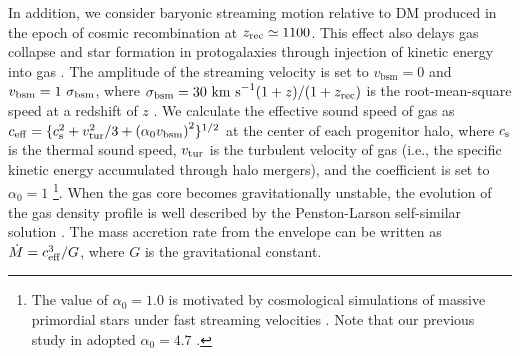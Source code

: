 \documentclass[twocolumn, twocolappendix]{aastex63}
\newcommand{\vbsm}{v_\mathrm{bsm}}
\begin{document}
\begin{CJK*}{UTF8}{gbsn}
In addition, we consider baryonic streaming motion relative to DM produced in the epoch of cosmic recombination at $z_{\rm rec} \simeq 1100$.
This effect also delays gas collapse and star formation in protogalaxies through injection of kinetic energy into gas
\citep[e.g.,][]{2012MNRAS.424.1335F, 2014MNRAS.439.1092T, 2017Sci...357.1375H,2019MNRAS.484.3510S,2021ApJ...917...60L}.
The amplitude of the streaming velocity is set to $\vbsm = 0$ and $\vbsm=1~\sigma_{\rm bsm}$, where $\sigma_{\rm bsm}=30~{\rm km~s}^{-1} (1+z)/(1+z_{\rm rec})$
is the root-mean-square speed at a redshift of $z$ \citep{2010PhRvD..82h3520T}.
We calculate the effective sound speed of gas as $c_{\rm eff} = \{c_{\rm s}^2+v_{\rm tur}^2/3+\left(\alpha_0 \vbsm \right)^2 \}^{1/2}$ at the center of each progenitor halo,
where $c_{\rm s}$ is the thermal sound speed, $v_{\rm tur}$ is the turbulent velocity of gas (i.e., the specific kinetic energy accumulated through halo mergers), and
the coefficient is set to $\alpha_0=1$ \footnote[1]{The value of $\alpha_0=1.0$ is motivated by cosmological simulations of massive primordial stars
under fast streaming velocities \citep{2017Sci...357.1375H,2019MNRAS.484.3510S}.
Note that our previous study in \citet{2021ApJ...917...60L} adopted $\alpha_0=4.7$ \citep{2018ApJ...855...17H}.}.
When the gas core becomes gravitationally unstable, the evolution of the gas density profile is well described by 
the Penston-Larson self-similar solution \citep{1969MNRAS.144..425P,1969MNRAS.145..271L}. 
The mass accretion rate from the envelope can be written as $\dot{M}=c_{\rm eff}^3/G$,
where $G$ is the gravitational constant.




\end{CJK*}
\end{document}
